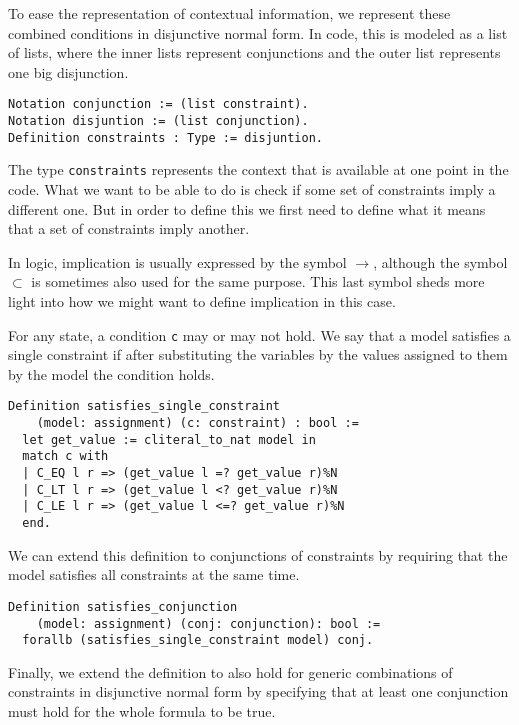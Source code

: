 To ease the representation of contextual information, we represent these combined conditions in 
disjunctive normal form. In code, this is modeled as a list of lists, where the inner lists represent 
conjunctions and the outer list represents one big disjunction.

\begin{verbatim}
Notation conjunction := (list constraint).
Notation disjuntion := (list conjunction).
Definition constraints : Type := disjuntion.
\end{verbatim}

The type \texttt{constraints} represents the context that is available at one point in the 
code. What we want to be able to do is check if some set of constraints imply a different one. But in 
order to define this we first need to define what it means that a set of constraints imply another.

In logic, implication is usually expressed by the symbol $\rightarrow$, although the symbol $\subset$ 
is sometimes also used for the same purpose. This last symbol sheds more light into how we might want 
to define implication in this case.

For any state, a condition \texttt{c} may or may not hold. We say that a model satisfies a 
single constraint if after substituting the variables by the values assigned to them by the model the 
condition holds.

\begin{verbatim}
Definition satisfies_single_constraint 
    (model: assignment) (c: constraint) : bool :=
  let get_value := cliteral_to_nat model in 
  match c with
  | C_EQ l r => (get_value l =? get_value r)%N
  | C_LT l r => (get_value l <? get_value r)%N
  | C_LE l r => (get_value l <=? get_value r)%N
  end.
\end{verbatim}

We can extend this definition to conjunctions of constraints by requiring that the model satisfies all 
constraints at the same time.

\begin{verbatim}
Definition satisfies_conjunction 
    (model: assignment) (conj: conjunction): bool :=
  forallb (satisfies_single_constraint model) conj.
\end{verbatim}

Finally, we extend the definition to also hold for generic combinations of constraints in disjunctive 
normal form by specifying that at least one conjunction must hold for the whole formula to be true.

